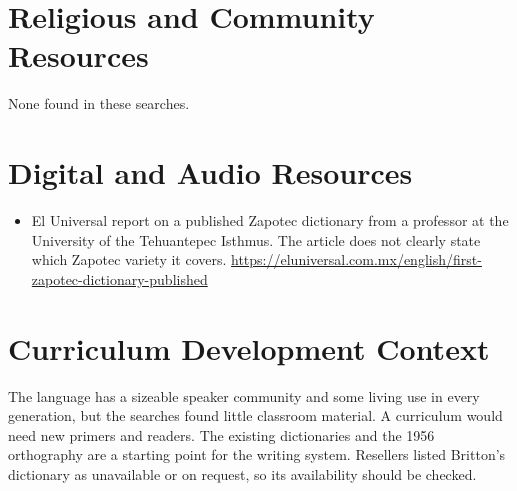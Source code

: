 \documentclass[12pt]{article}
\begin{document}
\section{Religious and Community Resources}
None found in these searches.

\section{Digital and Audio Resources}
\begin{itemize}
\item El Universal report on a published Zapotec dictionary from a professor at the University of the Tehuantepec Isthmus. The article does not clearly state which Zapotec variety it covers. \url{https://eluniversal.com.mx/english/first-zapotec-dictionary-published}
\end{itemize}

\section{Curriculum Development Context}
The language has a sizeable speaker community and some living use in every generation, but the searches found little classroom material. A curriculum would need new primers and readers. The existing dictionaries and the 1956 orthography are a starting point for the writing system. Resellers listed Britton's dictionary as unavailable or on request, so its availability should be checked.
\end{document}
